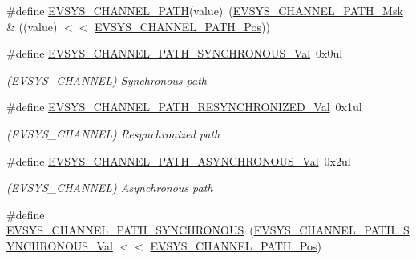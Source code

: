 \begin{DoxyCompactItemize}
\item 
\#define \mbox{\hyperlink{group___s_a_m_d21___e_v_s_y_s_gaa4ef9ef1fcd09eb4482879454e79421a}{E\+V\+S\+Y\+S\+\_\+\+C\+H\+A\+N\+N\+E\+L\+\_\+\+P\+A\+TH}}(value)~(\mbox{\hyperlink{group___s_a_m_d21___e_v_s_y_s_ga8b3ef7a0b4006e53d02e028a7357290d}{E\+V\+S\+Y\+S\+\_\+\+C\+H\+A\+N\+N\+E\+L\+\_\+\+P\+A\+T\+H\+\_\+\+Msk}} \& ((value) $<$$<$ \mbox{\hyperlink{group___s_a_m_d21___e_v_s_y_s_ga1c99b6755155dc2b405c63587973570b}{E\+V\+S\+Y\+S\+\_\+\+C\+H\+A\+N\+N\+E\+L\+\_\+\+P\+A\+T\+H\+\_\+\+Pos}}))
\item 
\#define \mbox{\hyperlink{group___s_a_m_d21___e_v_s_y_s_gaf113bdb42f1664532afb160e78b39fdb}{E\+V\+S\+Y\+S\+\_\+\+C\+H\+A\+N\+N\+E\+L\+\_\+\+P\+A\+T\+H\+\_\+\+S\+Y\+N\+C\+H\+R\+O\+N\+O\+U\+S\+\_\+\+Val}}~0x0ul
\begin{DoxyCompactList}\small\item\em (E\+V\+S\+Y\+S\+\_\+\+C\+H\+A\+N\+N\+EL) Synchronous path \end{DoxyCompactList}\item 
\#define \mbox{\hyperlink{group___s_a_m_d21___e_v_s_y_s_gaeb385f0d13f51660c582fb7e8d5a753a}{E\+V\+S\+Y\+S\+\_\+\+C\+H\+A\+N\+N\+E\+L\+\_\+\+P\+A\+T\+H\+\_\+\+R\+E\+S\+Y\+N\+C\+H\+R\+O\+N\+I\+Z\+E\+D\+\_\+\+Val}}~0x1ul
\begin{DoxyCompactList}\small\item\em (E\+V\+S\+Y\+S\+\_\+\+C\+H\+A\+N\+N\+EL) Resynchronized path \end{DoxyCompactList}\item 
\#define \mbox{\hyperlink{group___s_a_m_d21___e_v_s_y_s_gae66529525c793ce0b4621730bd6d5944}{E\+V\+S\+Y\+S\+\_\+\+C\+H\+A\+N\+N\+E\+L\+\_\+\+P\+A\+T\+H\+\_\+\+A\+S\+Y\+N\+C\+H\+R\+O\+N\+O\+U\+S\+\_\+\+Val}}~0x2ul
\begin{DoxyCompactList}\small\item\em (E\+V\+S\+Y\+S\+\_\+\+C\+H\+A\+N\+N\+EL) Asynchronous path \end{DoxyCompactList}\item 
\#define \mbox{\hyperlink{group___s_a_m_d21___e_v_s_y_s_ga78540f1cb8959a2498387637223852d5}{E\+V\+S\+Y\+S\+\_\+\+C\+H\+A\+N\+N\+E\+L\+\_\+\+P\+A\+T\+H\+\_\+\+S\+Y\+N\+C\+H\+R\+O\+N\+O\+US}}~(\mbox{\hyperlink{group___s_a_m_d21___e_v_s_y_s_gaf113bdb42f1664532afb160e78b39fdb}{E\+V\+S\+Y\+S\+\_\+\+C\+H\+A\+N\+N\+E\+L\+\_\+\+P\+A\+T\+H\+\_\+\+S\+Y\+N\+C\+H\+R\+O\+N\+O\+U\+S\+\_\+\+Val}} $<$$<$ \mbox{\hyperlink{group___s_a_m_d21___e_v_s_y_s_ga1c99b6755155dc2b405c63587973570b}{E\+V\+S\+Y\+S\+\_\+\+C\+H\+A\+N\+N\+E\+L\+\_\+\+P\+A\+T\+H\+\_\+\+Pos}})

\end{DoxyCompactItemize}
